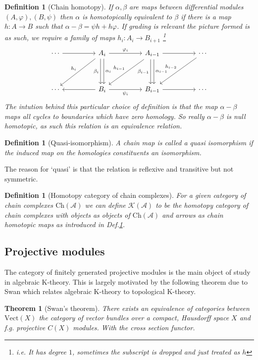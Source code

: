 \documentclass[12pt]{article}
\numberwithin{equation}{section}
\newcounter{dummy} \numberwithin{dummy}{section}
\newtheorem{theorem}[dummy]{Theorem}
\newtheorem{definition}[dummy]{Definition}
\begin{document}
	\begin{definition}[Chain homotopy]\label{chainhomotopy}
		If $\alpha, \beta $ are maps between differential modules $(A, \varphi), (B, \psi )$ then $\alpha $ is homotopically equivalent to $\beta $ if there is a map $h: A \to B $ such that $\alpha - \beta = \psi h+ h \varphi$. If grading is relevant the picture formed is as such, we require a family of maps $h_i: A_i \to B_{i+1}$ \footnote{i.e. It has degree $1$, sometimes the subscript is dropped and just treated as $h$}
		\[\begin{tikzcd}
			\cdots && {A_i} && {A_{i-1}} && \cdots \\
			\\
			\cdots && {B_i} && {B_{i-1}} && \cdots
			\arrow["{\varphi_i}", from=1-3, to=1-5]
			\arrow["{\psi_i}"', from=3-3, to=3-5]
			\arrow["{h_{i-1}}"', from=1-5, to=3-3]
			\arrow["{\beta_i}"', shift right, from=1-3, to=3-3]
			\arrow[from=3-3, to=3-1]
			\arrow["{h_i}"', from=1-3, to=3-1]
			\arrow["{\alpha_{i-1}}", shift left, from=1-5, to=3-5]
			\arrow[from=1-1, to=1-3]
			\arrow["{h_{i-2}}"', from=1-7, to=3-5]
			\arrow[from=1-5, to=1-7]
			\arrow["{\alpha_i}", shift left, from=1-3, to=3-3]
			\arrow["{\beta_{i-1}}"', shift right, from=1-5, to=3-5]
			\arrow[from=3-5, to=3-7]
		\end{tikzcd}\]
		The intution behind this particular choice of definition is that the map $\alpha - \beta $ maps all cycles to boundaries which have zero homology. So really $\alpha- \beta$ is null homotopic, as such this relation is an equivalence relation.
	\end{definition}
	\begin{definition}[Quasi-isomorphism]
		A chain map is called a quasi isomorphism if the induced map on the homologies constituents an isomorphism.
	\end{definition}
	The reason for `quasi' is that the relation is reflexive and transitive but not symmetric. 
	\begin{definition}[Homotopy category of chain complexes]
		For a given category of chain complexes $\mathrm{Ch}(\mathcal{A})$ we can define $\mathcal{K}(\mathcal{A})$ to be the homotopy category of chain complexes with objects as objects of $\mathrm{Ch}(\mathcal{A})$ and arrows as chain homotopic maps as introduced in Def.\ref{chainhomotopy}.
	\end{definition}
	
	\subsection{Projective modules}	
	The category of finitely generated projective modules is the main object of study in algebraic K-theory. This is largely motivated by the following theorem due to Swan \cite{Swan1962} which relates algebraic K-theory to topological K-theory.
	\begin{theorem}[Swan's theorem]
		There exists an equivalence of categories between $\mathrm{Vect}(X)$ the category of vector bundles over a compact, Hausdorff space $X$ and f.g. projective $C(X)$ modules. With the cross section functor.
	\end{theorem}
	
\end{document}
